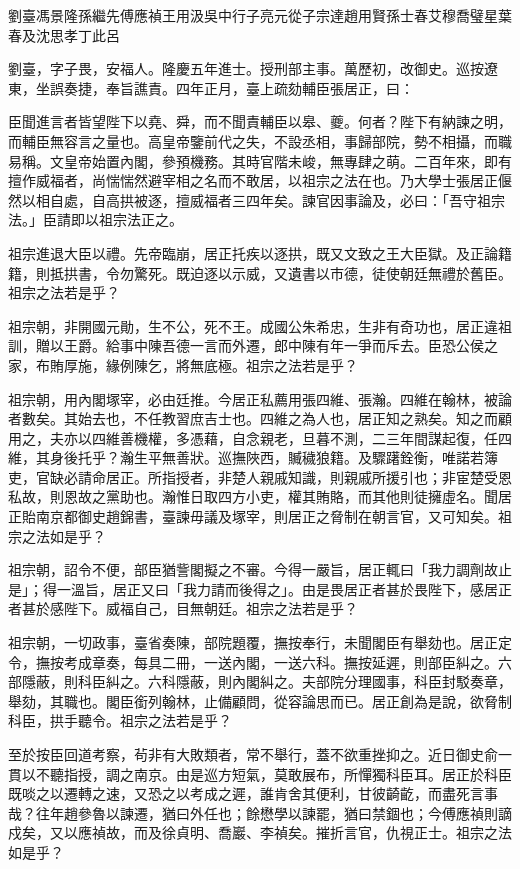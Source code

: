 
\begin{pinyinscope}
劉臺馮景隆孫繼先傅應禎王用汲吳中行子亮元從子宗達趙用賢孫士春艾穆喬璧星葉春及沈思孝丁此呂

劉臺，字子畏，安福人。隆慶五年進士。授刑部主事。萬歷初，改御史。巡按遼東，坐誤奏捷，奉旨譙責。四年正月，臺上疏劾輔臣張居正，曰：

臣聞進言者皆望陛下以堯、舜，而不聞責輔臣以皋、夔。何者？陛下有納諫之明，而輔臣無容言之量也。高皇帝鑒前代之失，不設丞相，事歸部院，勢不相攝，而職易稱。文皇帝始置內閣，參預機務。其時官階未峻，無專肆之萌。二百年來，即有擅作威福者，尚惴惴然避宰相之名而不敢居，以祖宗之法在也。乃大學士張居正偃然以相自處，自高拱被逐，擅威福者三四年矣。諫官因事論及，必曰：「吾守祖宗法。」臣請即以祖宗法正之。

祖宗進退大臣以禮。先帝臨崩，居正托疾以逐拱，既又文致之王大臣獄。及正論籍籍，則抵拱書，令勿驚死。既迫逐以示威，又遺書以市德，徒使朝廷無禮於舊臣。祖宗之法若是乎？

祖宗朝，非開國元勛，生不公，死不王。成國公朱希忠，生非有奇功也，居正違祖訓，贈以王爵。給事中陳吾德一言而外遷，郎中陳有年一爭而斥去。臣恐公侯之家，布賄厚施，緣例陳乞，將無底極。祖宗之法若是乎？

祖宗朝，用內閣塚宰，必由廷推。今居正私薦用張四維、張瀚。四維在翰林，被論者數矣。其始去也，不任教習庶吉士也。四維之為人也，居正知之熟矣。知之而顧用之，夫亦以四維善機權，多憑藉，自念親老，旦暮不測，二三年間謀起復，任四維，其身後托乎？瀚生平無善狀。巡撫陜西，贓穢狼籍。及驟躇銓衡，唯諾若簿吏，官缺必請命居正。所指授者，非楚人親戚知識，則親戚所援引也；非宦楚受恩私故，則恩故之黨助也。瀚惟日取四方小吏，權其賄賂，而其他則徒擁虛名。聞居正貽南京都御史趙錦書，臺諫毋議及塚宰，則居正之脅制在朝言官，又可知矣。祖宗之法如是乎？

祖宗朝，詔令不便，部臣猶訾閣擬之不審。今得一嚴旨，居正輒曰「我力調劑故止是」；得一溫旨，居正又曰「我力請而後得之」。由是畏居正者甚於畏陛下，感居正者甚於感陛下。威福自己，目無朝廷。祖宗之法若是乎？

祖宗朝，一切政事，臺省奏陳，部院題覆，撫按奉行，未聞閣臣有舉劾也。居正定令，撫按考成章奏，每具二冊，一送內閣，一送六科。撫按延遲，則部臣糾之。六部隱蔽，則科臣糾之。六科隱蔽，則內閣糾之。夫部院分理國事，科臣封駁奏章，舉劾，其職也。閣臣銜列翰林，止備顧問，從容論思而已。居正創為是說，欲脅制科臣，拱手聽令。祖宗之法若是乎？

至於按臣回道考察，茍非有大敗類者，常不舉行，蓋不欲重挫抑之。近日御史俞一貫以不聽指授，調之南京。由是巡方短氣，莫敢展布，所憚獨科臣耳。居正於科臣既啖之以遷轉之速，又恐之以考成之遲，誰肯舍其便利，甘彼齮齕，而盡死言事哉？往年趙參魯以諫遷，猶曰外任也；餘懋學以諫罷，猶曰禁錮也；今傅應禎則謫戍矣，又以應禎故，而及徐貞明、喬巖、李禎矣。摧折言官，仇視正士。祖宗之法如是乎？


\end{pinyinscope}
